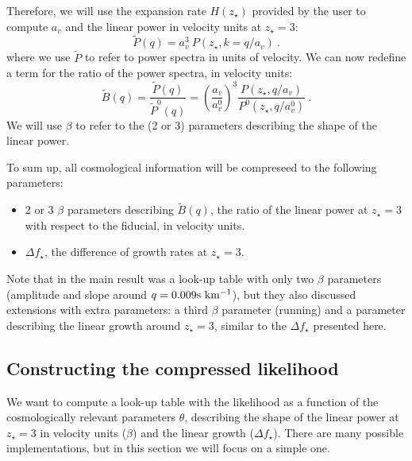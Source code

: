Therefore, we will use the expansion rate $H(z_\star)$ provided by the user
to compute $a_v$ and the linear power in velocity units at $z_\star=3$:
\begin{equation}
 \tilde P(q) = a_v^3 ~ P(z_\star, k= q / a_v) ~.
\end{equation}
where we use $\tilde P$ to refer to power spectra in units of velocity.
We can now redefine a term for the ratio of the power spectra, in velocity
units:
\begin{equation}
 \tilde B(q) = \frac{\tilde P(q)}{\tilde P^0(q)} 
  = \left(\frac{a_v}{a_v^0}\right)^3 
      \frac{P(z_\star, q / a_v)}{P^0(z_\star, q / a_v^0)} ~.
\end{equation}
We will use $\beta$ to refer to the (2 or 3) parameters describing the shape
of the linear power.

To sum up, all cosmological information will be compreseed to the following
parameters:
\begin{itemize}
 \item 2 or 3 $\beta$ parameters describing $\tilde B(q)$, the ratio of 
  the linear power at $z_\star=3$ with respect to the fiducial, in velocity
  units.
 \item $\Delta f_\star$, the difference of growth rates at $z_\star=3$.
\end{itemize}


Note that in \cite{McDonald2005a} the main result was a look-up table with
only two $\beta$ parameters (amplitude and slope around $q = 0.009 {\rm s~km^{-1}}$),
but they also discussed extensions with extra parameters: a third $\beta$ 
parameter (running) and a parameter describing the linear growth around 
$z_\star=3$, similar to the $\Delta f_\star$ presented here.


\subsection{Constructing the compressed likelihood}

We want to compute a look-up table with the likelihood as a function of the
cosmologically relevant parameters $\theta$, describing the shape of the
linear power at $z_\star=3$ in velocity units ($\beta$) and the linear growth
($\Delta f_\star$).
There are many possible implementations, but in this section we will focus
on a simple one. 

